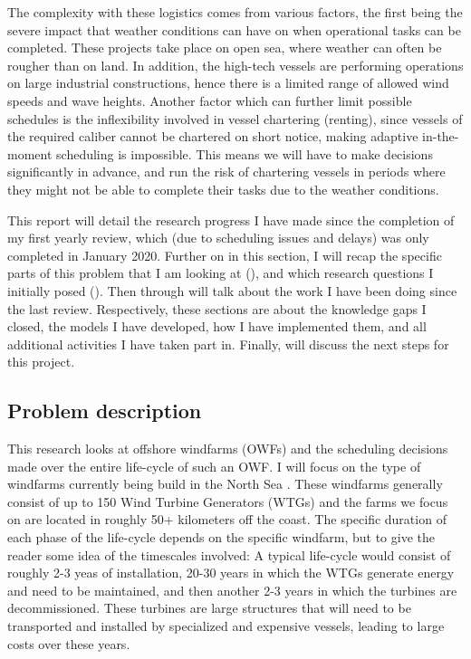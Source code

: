 \documentclass[a4paper,12pt]{article}
\begin{document}
The complexity with these logistics comes from various factors, the first being the severe impact that weather conditions can have on when operational tasks can be completed. These projects take place on open sea, where weather can often be rougher than on land. In addition, the high-tech vessels are performing operations on large industrial constructions, hence there is a limited range of allowed wind speeds and wave heights. Another factor which can further limit possible schedules is the inflexibility involved in vessel chartering (renting), since vessels of the required caliber cannot be chartered on short notice, making adaptive in-the-moment scheduling is impossible. This means we will have to make decisions significantly in advance, and run the risk of chartering vessels in periods where they might not be able to complete their tasks due to the weather conditions. 

This report will detail the research progress I have made since the completion of my first yearly review, which (due to scheduling issues and delays) was only completed in January 2020. Further on in this section, I will recap the specific parts of this problem that I am looking at (), and which research questions I initially posed (). Then  through   will talk about the work I have been doing since the last review. Respectively, these sections are about the knowledge gaps I closed, the models I have developed, how I have implemented them, and all additional activities I have taken part in. Finally,  will discuss the next steps for this project. 

\subsection{Problem description} \label{ss:prob}
This research looks at offshore windfarms (OWFs) and the scheduling decisions made over the entire life-cycle of such an OWF. I will focus on the type of windfarms currently being build in the North Sea \cite{ruk2017,barlow2018mixed}. These windfarms generally consist of up to 150 Wind Turbine Generators (WTGs) and the farms we focus on are located in roughly 50+ kilometers off the coast. The specific duration of each phase of the life-cycle depends on the specific windfarm, but to give the reader some idea of the timescales involved: A typical life-cycle would consist of roughly 2-3 yeas of installation, 20-30 years in which the WTGs generate energy and need to be maintained, and then another 2-3 years in which the turbines are decommissioned. These turbines are large structures that will need to be transported and installed by specialized and expensive vessels, leading to large costs over these years. 
\end{document}
